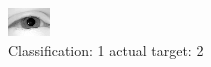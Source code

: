 \begin{figure}[h!]
\begin{center}
\includegraphics[width=0.60\columnwidth]{figures/ID2234_class_1_target_2.png}
\end{center}
\caption{ Classification: 1 actual target: 2}
\label{fig:ID2234_class_1_target_2}
\end{figure}
